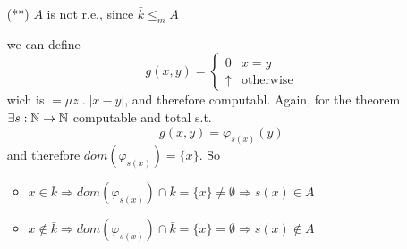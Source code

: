 \begin{counterexample}
\begin{enumerate}
  \item[(**)] $A$ is not r.e., since $\bar{k} \leq_m A$

    we can define
    \[
      g(x,y) = \begin{cases}
        0        & x=y \\
        \uparrow & \mbox{otherwise}
      \end{cases}
    \]
    wich is $= \mu z \; . \; |x-y|$, and therefore computabl. Again,
    for the \smn theorem $\exists s : \mathbb{N} \rightarrow \mathbb{N}$ computable and total
    s.t.
    \[
      g(x,y) = \varphi_{s(x)}(y)
    \]
    and therefore $dom(\varphi_{s(x)}) = \{x\}$. So
    \begin{itemize}
    \item
      \(x \in \bar{k} \Rightarrow dom(\varphi_{s(x)}) \cap \bar{k} =
      \{x\} \neq \emptyset \Rightarrow s(x) \in A\)
    \item
      \(x \notin \bar{k} \Rightarrow dom(\varphi_{s(x)}) \cap \bar{k}
      = \{x\} = \emptyset \Rightarrow s(x) \notin A\)
    \end{itemize}
  \end{enumerate}
\end{counterexample}